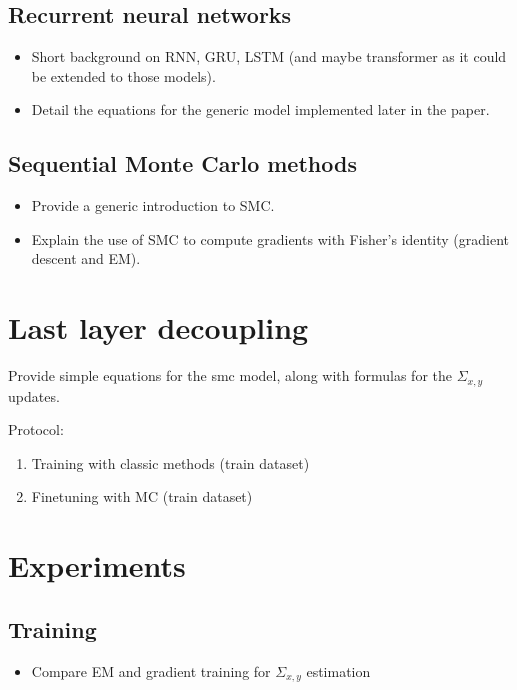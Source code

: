 \documentclass{article}
\begin{document}
\subsection{Recurrent neural networks}
\label{sec:background:rnn}
\begin{itemize}
	\item Short background on RNN, GRU, LSTM (and maybe transformer as it could be extended to those models).
	\item Detail the equations for the generic model implemented later in the paper.
\end{itemize}

\subsection{Sequential Monte Carlo methods}
\label{sec:background:smc}
\begin{itemize}
	\item Provide a generic introduction to SMC.
	\item Explain the use of SMC to compute gradients with Fisher's identity (gradient descent and EM).
\end{itemize}

\section{Last layer decoupling}
\label{sec:decoupling}

Provide simple equations for the smc model, along with formulas for the $\Sigma_{x, y}$ updates.

Protocol:
\begin{enumerate}
	\item Training with classic methods (train dataset)
	\item Finetuning with MC (train dataset)
\end{enumerate}

\section{Experiments}
\label{sec:exp}

\subsection{Training}%
\label{sub:training}

\begin{itemize}
	\item Compare EM and gradient training for $\Sigma_{x, y}$ estimation
\end{itemize}
\end{document}
